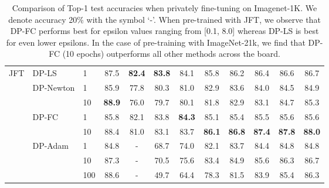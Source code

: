 \documentclass[letterpaper]{article} \usepackage{fullpage}
\begin{document}
\begin{table*}[!h]
\begin{tabular}{lllc|cccccccc}
		\multirow{8}{*}{JFT} & \multirow{ 1}{*}{DP-LS}
		                                          & 1      & 87.5          & \textbf{82.4} & \textbf{83.8} & 84.1 & 85.8 & 86.2 & 86.4 & 86.6 & 86.7 \\
		\addlinespace[0.1cm]
\addlinespace[0.1cm]
		            & \multirow{ 2}{*}{DP-Newton} & 1      & 85.9          & 77.8 & 80.3 & 81.0 & 82.9 & 83.6 & 84.0 & 84.5 & 84.9 \\
		            &                             & 10     & \textbf{88.9} & 76.0 & 79.7 & 80.1 & 81.8 & 82.9 & 83.1 & 84.7 & 85.3 \\
		\addlinespace[0.1cm]
\addlinespace[0.1cm]
		            & \multirow{ 2}{*}{DP-FC}     & 1      & 85.8          & 82.1 & 83.8 & \textbf{84.3} & 85.1 & 85.4 & 85.5 & 85.6 & 85.6 \\
		            &                             & 10     & 88.4          & 81.0 & 83.1 & 83.7 & \textbf{86.1} & \textbf{86.8} & \textbf{87.4} & \textbf{87.8} & \textbf{88.0} \\
		\addlinespace[0.1cm]
\addlinespace[0.1cm]
		            & \multirow{ 3}{*}{DP-Adam}   & 1      & 84.8          & -   & 68.7 & 74.0 & 82.1 & 83.7 & 84.4 & 84.8 & 84.8 \\
		            &                             & 10     & 87.3          & -   & 70.5 & 75.6 & 83.4 & 84.9 & 85.6 & 86.3 & 86.7 \\
		            &                             & 100    & 88.6          & -   & 49.7 & 64.4 & 78.3 & 81.5 & 83.9 & 85.4 & 86.3 \\
		\bottomrule
	\end{tabular}
	\caption{Comparison of Top-1 test accuracies when privately fine-tuning on Imagenet-1K. We denote accuracy  20\% with the symbol `-'. When pre-trained with JFT, we observe that DP-FC performs best for epsilon values ranging from [0.1, 8.0] whereas DP-LS is best for even lower epsilons. In the case of pre-training with ImageNet-21k, we find that DP-FC (10 epochs) outperforms all other methods across the board.}
	\label{tab:imagenet}
\end{table*}
\end{document}
